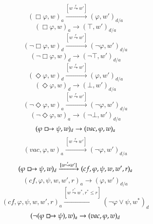 \documentclass[a4paper,american]{paper}
\begin{document}
\begin{figure}[H]
	\centering
	\begin{equation}
		(\Box\varphi ,w)_a\xrightarrow{[w\overset{r}{\leadsto}w']} (\varphi ,w')_{d/a}
	\end{equation}
	\begin{equation}
		(\Box\varphi ,w)_a\rightarrow (\top ,w')_{d/a}
	\end{equation}
	\begin{equation}
		(\neg\Box\varphi ,w)_d\xrightarrow{[w\overset{r}{\leadsto}w']} (\neg\varphi ,w')_{d/a}
	\end{equation}
	\begin{equation}
		(\neg\Box\varphi ,w)_d\rightarrow (\neg\top ,w')_{d/a}
	\end{equation}
	\begin{equation}
		(\Diamond\varphi ,w)_d\xrightarrow{[w\overset{r}{\leadsto}w']} (\varphi ,w')_{d/a}
	\end{equation}
	\begin{equation}
		(\Diamond\varphi ,w)_d\rightarrow (\bot ,w')_{d/a}
	\end{equation}
	\begin{equation}
		(\neg\Diamond\varphi ,w)_a\xrightarrow{[w\overset{r}{\leadsto}w']} (\neg\varphi ,w')_{d/a}
	\end{equation}
	\begin{equation}
		(\neg\Diamond\varphi ,w)_a\rightarrow (\neg\bot ,w')_{d/a}
	\end{equation}
	\begin{equation}
		(\varphi\boxright\psi ,w)_d\rightarrow (vac,\varphi ,w)_a
	\end{equation}
	\begin{equation}
		(vac,\varphi ,w)_a\xrightarrow{[w\overset{r}{\leadsto}w']}(\neg\varphi ,w')_{d/a}
	\end{equation}
	\begin{equation}
		(\varphi\boxright\psi ,w)_d\xrightarrow{[w\overset{r}{\leadsto}w']}(cf,\varphi ,\psi ,w,w',r)_a
	\end{equation}
	\begin{equation}
		(cf,\varphi ,\psi ,w,w',r)_a\rightarrow (\varphi ,w')_{d/a}
	\end{equation}
	\begin{equation}
		(cf,\varphi ,\psi ,w,w',r)_a\xrightarrow{[w\overset{r^*}{\leadsto}w^*,r^*\leq r]}(\neg\varphi\vee\psi ,w^*)_d
	\end{equation}
	\begin{equation}
		(\neg (\varphi\boxright\psi ),w)_a\rightarrow (vac,\varphi ,w)_d

\end{equation}
\end{figure}
\end{document}
